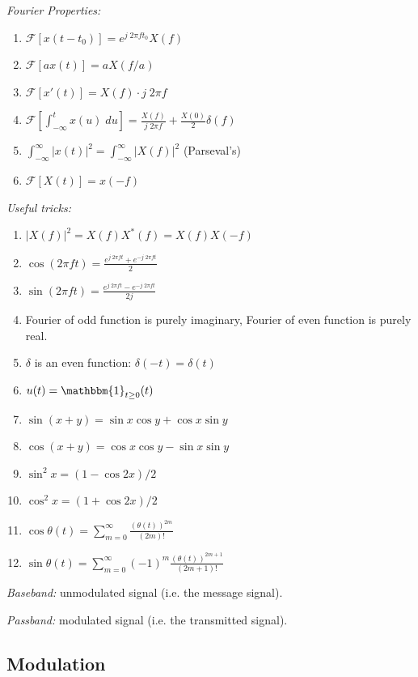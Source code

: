 \documentclass[12pt]{report}
\newcommand{\ind}{\mathbbm{1}}
\newcommand{\abs}[1]{\left\vert #1 \right\vert}
\newcommand{\F}{\mathcal{F}}
\begin{document}
\emph{Fourier Properties:}
\begin{enumerate}
    \item $\F[x(t - t_0)] = e^{j\; 2\pi f t_0} X(f)$
    \item $\F[ax(t)] = aX(f/a)$
    \item $\F[x'(t)] = X(f) \cdot j\; 2\pi f$
    \item $\F[\int_{-\infty}^t x(u)\; du] = \frac{X(f)}{j\; 2\pi f} + \frac{X(0)}{2} \delta(f)$
    \item $\int_{-\infty}^{\infty} \abs{x(t)}^2 = \int_{-\infty}^{\infty} \abs{X(f)}^2$ (Parseval's)
    \item $\F[X(t)] = x(-f)$  
\end{enumerate}

\emph{Useful tricks:}
\begin{enumerate}
    \item $\abs{X(f)}^2 = X(f) X^*(f) = X(f) X(-f)$
    \item $\cos(2\pi f t) = \frac{e^{j\; 2\pi f t} + e^{-j\; 2\pi f t}}{2}$
    \item $\sin(2\pi f t) = \frac{e^{j\; 2\pi f t} - e^{-j\; 2\pi f t}}{2j}$
    \item Fourier of odd function is purely imaginary, Fourier of even function is purely real.
    \item $\delta$ is an even function: $\delta(-t) = \delta(t)$
    \item $u(t) = \ind_{t \geq 0}(t)$ 
    \item $\sin(x + y) = \sin x \cos y + \cos x \sin y$
    \item $\cos(x + y) = \cos x \cos y - \sin x \sin y$
    \item $\sin^2 x = (1 - \cos 2 x)/2$
    \item $\cos^2 x = (1 + \cos 2x)/ 2$
    \item $\cos \theta(t) = \sum_{m=0}^{\infty} \frac{(\theta(t))^{2m}}{(2m)!}$
    \item $\sin \theta(t) = \sum_{m=0}^{\infty} (-1)^m \frac{(\theta(t))^{2m+1}}{(2m + 1)!}$
\end{enumerate}

\emph{Baseband:} unmodulated signal (i.e. the message signal).

\emph{Passband:} modulated signal (i.e. the transmitted signal).

\subsection{Modulation}
\end{document}
